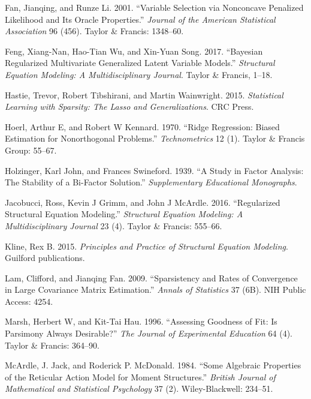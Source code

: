 \documentclass[article]{jss}
\begin{document}
\hypertarget{ref-fan2001variable}{}
Fan, Jianqing, and Runze Li. 2001. ``Variable Selection via Nonconcave
Penalized Likelihood and Its Oracle Properties.'' \emph{Journal of the
American Statistical Association} 96 (456). Taylor \& Francis: 1348--60.

\hypertarget{ref-feng2017bayesian}{}
Feng, Xiang-Nan, Hao-Tian Wu, and Xin-Yuan Song. 2017. ``Bayesian
Regularized Multivariate Generalized Latent Variable Models.''
\emph{Structural Equation Modeling: A Multidisciplinary Journal}. Taylor
\& Francis, 1--18.

\hypertarget{ref-hastie2015statistical}{}
Hastie, Trevor, Robert Tibshirani, and Martin Wainwright. 2015.
\emph{Statistical Learning with Sparsity: The Lasso and
Generalizations}. CRC Press.

\hypertarget{ref-hoerl1970}{}
Hoerl, Arthur E, and Robert W Kennard. 1970. ``Ridge Regression: Biased
Estimation for Nonorthogonal Problems.'' \emph{Technometrics} 12 (1).
Taylor \& Francis Group: 55--67.

\hypertarget{ref-holzinger1939study}{}
Holzinger, Karl John, and Frances Swineford. 1939. ``A Study in Factor
Analysis: The Stability of a Bi-Factor Solution.'' \emph{Supplementary
Educational Monographs}.

\hypertarget{ref-jacobucci2016regularized}{}
Jacobucci, Ross, Kevin J Grimm, and John J McArdle. 2016. ``Regularized
Structural Equation Modeling.'' \emph{Structural Equation Modeling: A
Multidisciplinary Journal} 23 (4). Taylor \& Francis: 555--66.

\hypertarget{ref-kline2015principles}{}
Kline, Rex B. 2015. \emph{Principles and Practice of Structural Equation
Modeling}. Guilford publications.

\hypertarget{ref-lam2009sparsistency}{}
Lam, Clifford, and Jianqing Fan. 2009. ``Sparsistency and Rates of
Convergence in Large Covariance Matrix Estimation.'' \emph{Annals of
Statistics} 37 (6B). NIH Public Access: 4254.

\hypertarget{ref-marsh1996assessing}{}
Marsh, Herbert W, and Kit-Tai Hau. 1996. ``Assessing Goodness of Fit: Is
Parsimony Always Desirable?'' \emph{The Journal of Experimental
Education} 64 (4). Taylor \& Francis: 364--90.

\hypertarget{ref-McArdle_1984}{}
McArdle, J. Jack, and Roderick P. McDonald. 1984. ``Some Algebraic
Properties of the Reticular Action Model for Moment Structures.''
\emph{British Journal of Mathematical and Statistical Psychology} 37
(2). Wiley-Blackwell: 234--51.
\end{document}
